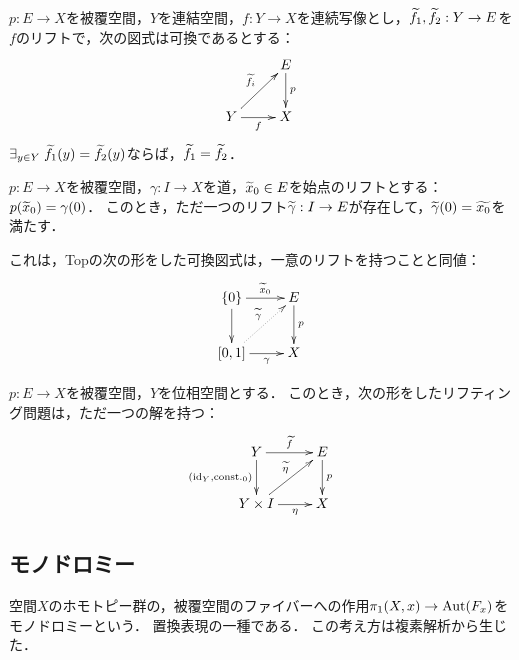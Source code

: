 \documentclass[uplatex,dvipdfmx]{jsreport}
\begin{document}
\begin{lemma}
    $p:E\to X$を被覆空間，$Y$を連結空間，$f:Y\to X$を連続写像とし，$\widetilde{f_1},\widetilde{f_2}:Y\to E$を$f$のリフトで，次の図式は可換であるとする：
    \[\xymatrix{
        &E\ar[d]^-p\\
        Y\ar[ur]^-{\wt{f}_i}\ar[r]_-f&X
    }\]
    $\exists_{y\in Y}\;\widetilde{f}_1(y)=\widetilde{f}_2(y)$ならば，$\widetilde{f}_1=\widetilde{f}_2$．
\end{lemma}

\begin{lemma}
    $p:E\to X$を被覆空間，$\gamma:I\to X$を道，$\widetilde{x}_0\in E$を始点のリフトとする：$p(\widetilde{x}_0)=\gamma(0)$．
    このとき，ただ一つのリフト$\widetilde{\gamma}:I\to E$が存在して，$\widetilde{\gamma}(0)=\widetilde{x_0}$を満たす．
\end{lemma}
\begin{remarks}
    これは，Topの次の形をした可換図式は，一意のリフトを持つことと同値：
    \[\xymatrix{
        \{0\}\ar[r]^-{\wt{x}_0}\ar[d]&E\ar[d]^-p\\
        {[0,1]}\ar[r]_-\gamma\ar@{.>}[ur]^-{\wt{\gamma}}&X
    }\]
\end{remarks}

\begin{proposition}
    $p:E\to X$を被覆空間，$Y$を位相空間とする．
    このとき，次の形をしたリフティング問題は，ただ一つの解を持つ：
    \[\xymatrix{
        Y\ar[r]^-{\wt{f}}\ar[d]_-{(\id_Y,\const_0)}&E\ar[d]^-p\\
        Y\times I\ar[r]_-{\eta}\ar[ur]^-{\wt{\eta}}&X
    }\]
\end{proposition}

\subsection{モノドロミー}

\begin{tcolorbox}[colframe=ForestGreen, colback=ForestGreen!10!white,breakable,colbacktitle=ForestGreen!40!white,coltitle=black,fonttitle=\bfseries\sffamily,
title=]
    空間$X$のホモトピー群の，被覆空間のファイバーへの作用$\pi_1(X,x)\to\mathrm{Aut}(F_x)$をモノドロミーという．
    置換表現の一種である．
    この考え方は複素解析から生じた．
\end{tcolorbox}
\end{document}
